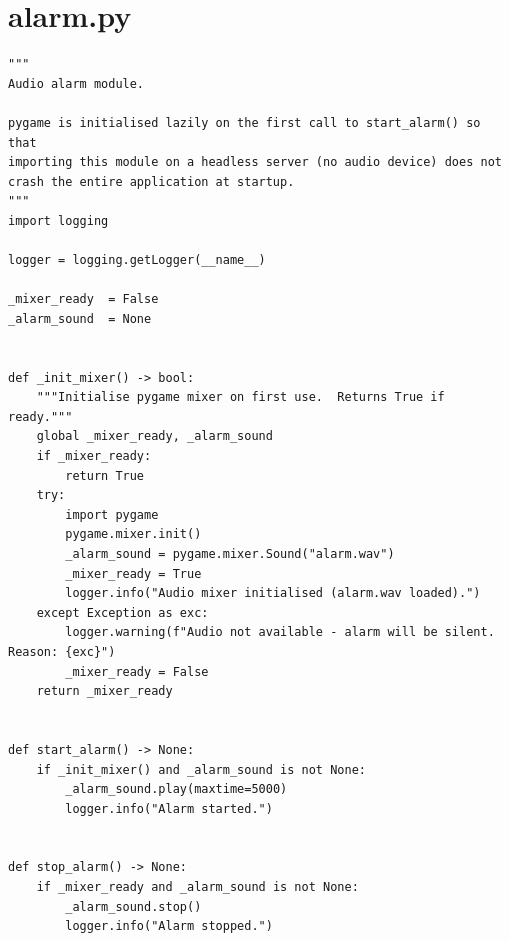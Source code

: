 \documentclass[12pt,a4paper]{report}
\begin{document}
\section{alarm.py}
\begin{lstlisting}
"""
Audio alarm module.

pygame is initialised lazily on the first call to start_alarm() so that
importing this module on a headless server (no audio device) does not
crash the entire application at startup.
"""
import logging

logger = logging.getLogger(__name__)

_mixer_ready  = False
_alarm_sound  = None


def _init_mixer() -> bool:
    """Initialise pygame mixer on first use.  Returns True if ready."""
    global _mixer_ready, _alarm_sound
    if _mixer_ready:
        return True
    try:
        import pygame
        pygame.mixer.init()
        _alarm_sound = pygame.mixer.Sound("alarm.wav")
        _mixer_ready = True
        logger.info("Audio mixer initialised (alarm.wav loaded).")
    except Exception as exc:
        logger.warning(f"Audio not available - alarm will be silent. Reason: {exc}")
        _mixer_ready = False
    return _mixer_ready


def start_alarm() -> None:
    if _init_mixer() and _alarm_sound is not None:
        _alarm_sound.play(maxtime=5000)
        logger.info("Alarm started.")


def stop_alarm() -> None:
    if _mixer_ready and _alarm_sound is not None:
        _alarm_sound.stop()
        logger.info("Alarm stopped.")
\end{lstlisting}

\end{document}
